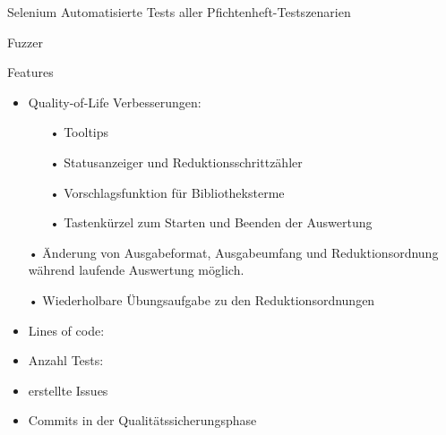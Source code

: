 \documentclass[10pt]{beamer}
\begin{document}
\begin{frame}{Selenium}
Automatisierte Tests aller Pfichtenheft-Testszenarien
\end{frame}

\begin{frame} {Fuzzer}

\end{frame}

\begin{frame}{Features}
\begin{itemize}
\item Quality-of-Life Verbesserungen:
\begin{itemize}
\item[•] Tooltips
\item[•] Statusanzeiger und Reduktionsschrittzähler
\item[•] Vorschlagsfunktion für Bibliotheksterme
\item[•] Tastenkürzel zum Starten und Beenden der Auswertung
\end{itemize}
\item[•] Änderung von Ausgabeformat, Ausgabeumfang und Reduktionsordnung während laufende Auswertung möglich.
\item[•] Wiederholbare Übungsaufgabe zu den Reduktionsordnungen
\end{itemize}
\end{frame}

\begin{frame} %
\begin{itemize}
\item Lines of code:
\item Anzahl Tests:
\item erstellte Issues
\item Commits in der Qualitätssicherungsphase
\end{itemize}
\end{frame}
\end{document}

